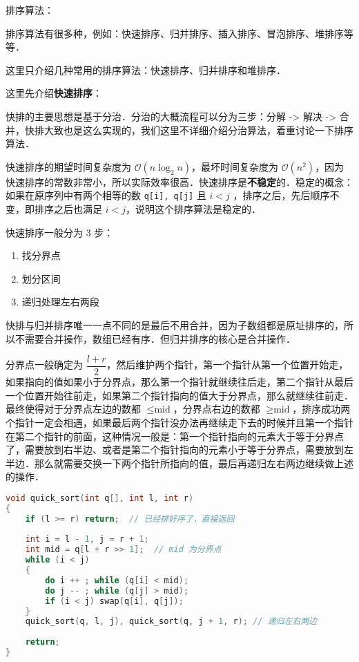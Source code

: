 
排序算法：

排序算法有很多种，例如：快速排序、归并排序、插入排序、冒泡排序、堆排序等等．

这里只介绍几种常用的排序算法：快速排序、归并排序和堆排序．

这里先介绍\textbf{快速排序}：

快排的主要思想是基于分治．分治的大概流程可以分为三步：分解 -> 解决 -> 合并，快排大致也是这么实现的，我们这里不详细介绍分治算法，着重讨论一下排序算法．

快速排序的期望时间复杂度为 $\mathcal{O}(n \log_2 n)$，最坏时间复杂度为 $\mathcal{O}(n^2)$，因为快速排序的常数非常小，所以实际效率很高．快速排序是\textbf{不稳定}的．稳定的概念：如果在原序列中有两个相等的数 \verb|q[i], q[j]| 且 $i < j$ ，排序之后，先后顺序不变，即排序之后也满足 $i < j$，说明这个排序算法是稳定的．

快速排序一般分为 $3$ 步：
\begin{enumerate}
\item 找分界点
\item 划分区间
\item 递归处理左右两段
\end{enumerate}

快排与归并排序唯一一点不同的是最后不用合并，因为子数组都是原址排序的，所以不需要合并操作，数组已经有序．但归并排序的核心是合并操作．

分界点一般确定为 $\dfrac{l+r}{2}$，然后维护两个指针，第一个指针从第一个位置开始走，如果指向的值如果小于分界点，那么第一个指针就继续往后走，第二个指针从最后一个位置开始往前走，如果第二个指针指向的值大于分界点，那么就继续往前走．最终使得对于分界点左边的数都 $\leq \text{mid}$，分界点右边的数都 $\geq \text{mid}$，排序成功两个指针一定会相遇，如果最后两个指针没办法再继续走下去的时候并且第一个指针在第二个指针的前面，这种情况一般是：第一个指针指向的元素大于等于分界点了，需要放到右半边、或者是第二个指针指向的元素小于等于分界点，需要放到左半边．那么就需要交换一下两个指针所指向的值，最后再递归左右两边继续做上述的操作．


\begin{lstlisting}[language=cpp]
void quick_sort(int q[], int l, int r)
{
    if (l >= r) return;  // 已经排好序了，直接返回
		
    int i = l - 1, j = r + 1;
    int mid = q[l + r >> 1];  // mid 为分界点
    while (i < j)
    {
        do i ++ ; while (q[i] < mid);
        do j -- ; while (q[j] > mid);
        if (i < j) swap(q[i], q[j]);
    }
    quick_sort(q, l, j), quick_sort(q, j + 1, r); // 递归左右两边
    
    return;
}

\end{lstlisting}


